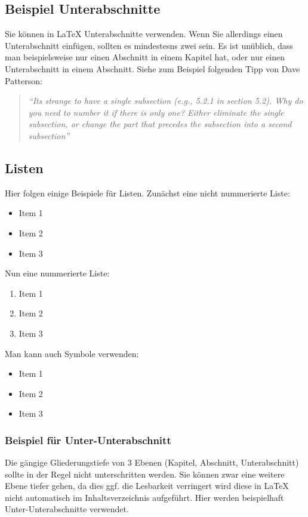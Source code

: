 \subsection{Beispiel Unterabschnitte} %
\label{sub:bsp_unterabschnitt}
Sie können in \LaTeX{} Unterabschnitte verwenden. Wenn Sie allerdings einen Unterabschnitt einfügen, sollten es mindestesns zwei sein. Es ist unüblich, dass man beispielsweise nur einen Abschnitt in einem Kapitel hat, oder nur einen Unterabschnitt in einem Abschnitt. Siehe zum Beispiel folgenden Tipp von Dave Patterson: 

\begin{quotation}
	\emph{``Its strange to have a single subsection (e.g., 5.2.1 in section 5.2). Why do you need to number it if there is only one? Either eliminate the single subsection, or change the part that precedes the subsection into a second subsection''}
	\citep{Patterson2013}
\end{quotation} 



\subsection{Listen} %
\label{sub:listen}
Hier folgen einige Beispiele für Listen. Zunächst eine nicht nummerierte Liste: 

\begin{itemize}
	\item Item 1
	\item Item 2
	\item Item 3
\end{itemize}

Nun eine nummerierte Liste:

\begin{enumerate}
	\item Item 1
	\item Item 2
	\item Item 3
\end{enumerate}

Man kann auch Symbole verwenden:

\begin{itemize}
\renewcommand{\labelitemi}{$\rightarrow$}
	\item Item 1
	\item Item 2
	\item Item 3
\end{itemize}

\subsubsection{Beispiel für Unter-Unterabschnitt} %
\label{ssub:bsp_unterunterabschnitt}
Die gängige Gliederungstiefe von 3 Ebenen (Kapitel, Abschnitt, Unterabschnitt) sollte in der Regel nicht unterschritten werden. Sie können zwar eine weitere Ebene tiefer gehen, da dies ggf. die Lesbarkeit verringert wird diese in \LaTeX{} nicht automatisch im Inhaltsverzeichnis aufgeführt. Hier werden beispielhaft Unter-Unterabschnitte verwendet. 

